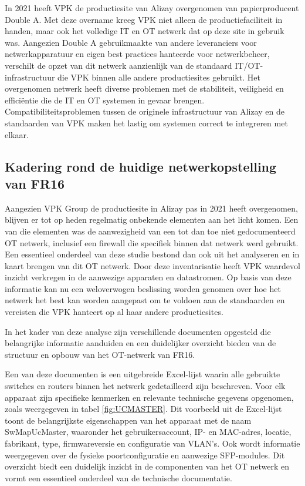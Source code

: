 \vspace{5mm}
In 2021 heeft VPK de productiesite van Alizay overgenomen van papierproducent Double A. Met deze overname kreeg VPK niet alleen de productiefaciliteit in handen, maar ook het volledige IT en OT netwerk dat op deze site in gebruik was. Aangezien Double A gebruikmaakte van andere leveranciers voor netwerkapparatuur en eigen best practices hanteerde voor netwerkbeheer, verschilt de opzet van dit netwerk aanzienlijk van de standaard IT/OT-infrastructuur die VPK binnen alle andere productiesites gebruikt.
Het overgenomen netwerk heeft diverse problemen met de stabiliteit, veiligheid en efficiëntie die de IT en OT systemen in gevaar brengen. Compatibiliteitsproblemen tussen de originele infrastructuur van Alizay en de standaarden van VPK maken het lastig om systemen correct te integreren met elkaar.

\subsection{Kadering rond de huidige netwerkopstelling van FR16}
Aangezien VPK Group de productiesite in Alizay pas in 2021 heeft overgenomen, blijven er tot op heden regelmatig onbekende elementen aan het licht komen. Een van die elementen was de aanwezigheid van een tot dan toe niet gedocumenteerd OT netwerk, inclusief een firewall die specifiek binnen dat netwerk werd gebruikt. Een essentieel onderdeel van deze studie bestond dan ook uit het analyseren en in kaart brengen van dit OT netwerk. Door deze inventarisatie heeft VPK waardevol inzicht verkregen in de aanwezige apparaten en datastromen. Op basis van deze informatie kan nu een weloverwogen beslissing worden genomen over hoe het netwerk het best kan worden aangepast om te voldoen aan de standaarden en vereisten die VPK hanteert op al haar andere productiesites.

\vspace{5mm}
In het kader van deze analyse zijn verschillende documenten opgesteld die belangrijke informatie aanduiden en een duidelijker overzicht bieden van de structuur en opbouw van het OT-netwerk van FR16.

\vspace{5mm}
Een van deze documenten is een uitgebreide Excel-lijst waarin alle gebruikte switches en routers binnen het netwerk gedetailleerd zijn beschreven. Voor elk apparaat zijn specifieke kenmerken en relevante technische gegevens opgenomen, zoals weergegeven in tabel \ref{fig:UCMASTER}. Dit voorbeeld uit de Excel-lijst toont de belangrijkste eigenschappen van het apparaat met de naam SwMapUcMaster, waaronder het gebruikersaccount, IP- en MAC-adres, locatie, fabrikant, type, firmwareversie en configuratie van VLAN’s. Ook wordt informatie weergegeven over de fysieke poortconfiguratie en aanwezige SFP-modules. Dit overzicht biedt een duidelijk inzicht in de componenten van het OT netwerk en vormt een essentieel onderdeel van de technische documentatie.

